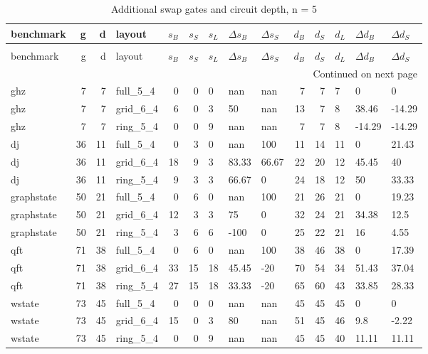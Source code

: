 \begin{longtable}{lrrlrrlllrrlll}
\caption{Additional swap gates and circuit depth, n = 5} \label{benchmark-table-5} \\
\toprule
benchmark & g & d & layout & $s_B$ & $s_S$ & $s_L$ & $\Delta s_B$ & $\Delta s_S$ & $d_B$ & $d_S$ & $d_L$ & $\Delta d_B$ & $\Delta d_S$ \\
\midrule
\endfirsthead
\caption[]{Additional swap gates and circuit depth, n = 5} \\
\toprule
benchmark & g & d & layout & $s_B$ & $s_S$ & $s_L$ & $\Delta s_B$ & $\Delta s_S$ & $d_B$ & $d_S$ & $d_L$ & $\Delta d_B$ & $\Delta d_S$ \\
\midrule
\endhead
\midrule
\multicolumn{14}{r}{Continued on next page} \\
\midrule
\endfoot
\bottomrule
\endlastfoot
ghz & 7 & 7 & full\_5\_4 & 0 & 0 & 0 & nan & nan & 7 & 7 & 7 & 0 & 0 \\
ghz & 7 & 7 & grid\_6\_4 & 6 & 0 & 3 & 50 & nan & 13 & 7 & 8 & 38.46 & -14.29 \\
ghz & 7 & 7 & ring\_5\_4 & 0 & 0 & 9 & nan & nan & 7 & 7 & 8 & -14.29 & -14.29 \\
dj & 36 & 11 & full\_5\_4 & 0 & 3 & 0 & nan & 100 & 11 & 14 & 11 & 0 & 21.43 \\
dj & 36 & 11 & grid\_6\_4 & 18 & 9 & 3 & 83.33 & 66.67 & 22 & 20 & 12 & 45.45 & 40 \\
dj & 36 & 11 & ring\_5\_4 & 9 & 3 & 3 & 66.67 & 0 & 24 & 18 & 12 & 50 & 33.33 \\
graphstate & 50 & 21 & full\_5\_4 & 0 & 6 & 0 & nan & 100 & 21 & 26 & 21 & 0 & 19.23 \\
graphstate & 50 & 21 & grid\_6\_4 & 12 & 3 & 3 & 75 & 0 & 32 & 24 & 21 & 34.38 & 12.5 \\
graphstate & 50 & 21 & ring\_5\_4 & 3 & 6 & 6 & -100 & 0 & 25 & 22 & 21 & 16 & 4.55 \\
qft & 71 & 38 & full\_5\_4 & 0 & 6 & 0 & nan & 100 & 38 & 46 & 38 & 0 & 17.39 \\
qft & 71 & 38 & grid\_6\_4 & 33 & 15 & 18 & 45.45 & -20 & 70 & 54 & 34 & 51.43 & 37.04 \\
qft & 71 & 38 & ring\_5\_4 & 27 & 15 & 18 & 33.33 & -20 & 65 & 60 & 43 & 33.85 & 28.33 \\
wstate & 73 & 45 & full\_5\_4 & 0 & 0 & 0 & nan & nan & 45 & 45 & 45 & 0 & 0 \\
wstate & 73 & 45 & grid\_6\_4 & 15 & 0 & 3 & 80 & nan & 51 & 45 & 46 & 9.8 & -2.22 \\
wstate & 73 & 45 & ring\_5\_4 & 0 & 0 & 9 & nan & nan & 45 & 45 & 40 & 11.11 & 11.11 \\

\end{longtable}
